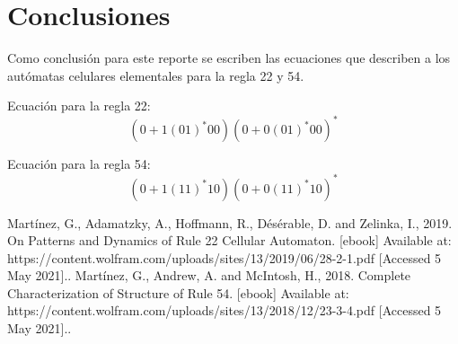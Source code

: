 \documentclass[11pt]{article}
\begin{document}
	\section{Conclusiones}
	Como conclusión para este reporte se escriben las ecuaciones que describen a los autómatas celulares elementales para la regla 22 y 54.\par
		Ecuación para la regla 22:\[(0+1(01)^\ast00)(0+0(01)^\ast00)^\ast\]\par
	Ecuación para la regla 54: \[(0+1(11)^\ast10)(0+0(11)^\ast10)^\ast\]
	\begin{thebibliography}{1}
  Martínez, G., Adamatzky, A., Hoffmann, R., Désérable, D. and Zelinka, I., 2019. On Patterns and Dynamics of Rule 22 Cellular Automaton. [ebook] Available at: https://content.wolfram.com/uploads/sites/13/2019/06/28-2-1.pdf [Accessed 5 May 2021]..	
  Martínez, G., Andrew, A. and McIntosh, H., 2018. Complete Characterization of Structure of Rule 54. [ebook] Available at: https://content.wolfram.com/uploads/sites/13/2018/12/23-3-4.pdf [Accessed 5 May 2021]..
\end{thebibliography}
\end{document}
